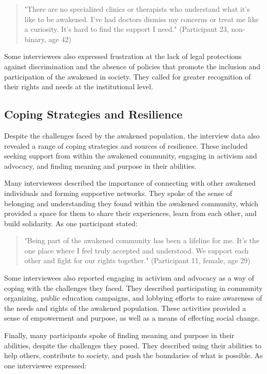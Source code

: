 \documentclass[12pt, a4paper]{article}
\begin{document}
\begin{quote}
    "There are no specialized clinics or therapists who understand what it's like to be awakened. I've had doctors dismiss my concerns or treat me like a curiosity. It's hard to find the support I need." (Participant 23, non-binary, age 42)
\end{quote}

Some interviewees also expressed frustration at the lack of legal protections against discrimination and the absence of policies that promote the inclusion and participation of the awakened in society. They called for greater recognition of their rights and needs at the institutional level.

\subsection{Coping Strategies and Resilience}
Despite the challenges faced by the awakened population, the interview data also revealed a range of coping strategies and sources of resilience. These included seeking support from within the awakened community, engaging in activism and advocacy, and finding meaning and purpose in their abilities.

Many interviewees described the importance of connecting with other awakened individuals and forming supportive networks. They spoke of the sense of belonging and understanding they found within the awakened community, which provided a space for them to share their experiences, learn from each other, and build solidarity. As one participant stated:

\begin{quote}
    "Being part of the awakened community has been a lifeline for me. It's the one place where I feel truly accepted and understood. We support each other and fight for our rights together." (Participant 11, female, age 29)
\end{quote}

Some interviewees also reported engaging in activism and advocacy as a way of coping with the challenges they faced. They described participating in community organizing, public education campaigns, and lobbying efforts to raise awareness of the needs and rights of the awakened population. These activities provided a sense of empowerment and purpose, as well as a means of effecting social change.

Finally, many participants spoke of finding meaning and purpose in their abilities, despite the challenges they posed. They described using their abilities to help others, contribute to society, and push the boundaries of what is possible. As one interviewee expressed:
\end{document}
